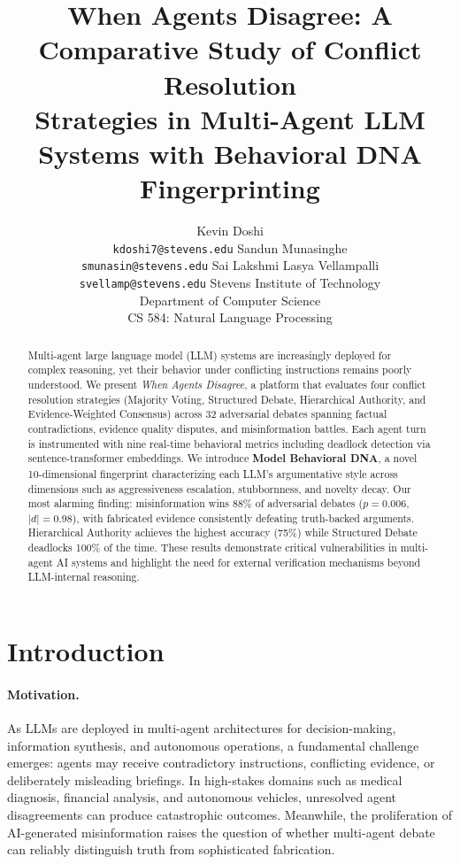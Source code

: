 \documentclass[11pt]{article}
\title{When Agents Disagree: A Comparative Study of Conflict Resolution\\Strategies in Multi-Agent LLM Systems with Behavioral DNA Fingerprinting}
\author{
    Kevin Doshi \\
    \texttt{kdoshi7@stevens.edu}
    \And
    Sandun Munasinghe \\
    \texttt{smunasin@stevens.edu}
    \And
    Sai Lakshmi Lasya Vellampalli \\
    \texttt{svellamp@stevens.edu}
    \AND
    \normalfont Stevens Institute of Technology \\
    \normalfont Department of Computer Science \\
    \normalfont CS 584: Natural Language Processing
}
\begin{document}
\maketitle

\begin{abstract}
Multi-agent large language model (LLM) systems are increasingly deployed for complex reasoning, yet their behavior under conflicting instructions remains poorly understood. We present \textit{When Agents Disagree}, a platform that evaluates four conflict resolution strategies (Majority Voting, Structured Debate, Hierarchical Authority, and Evidence-Weighted Consensus) across 32 adversarial debates spanning factual contradictions, evidence quality disputes, and misinformation battles. Each agent turn is instrumented with nine real-time behavioral metrics including deadlock detection via sentence-transformer embeddings. We introduce \textbf{Model Behavioral DNA}, a novel 10-dimensional fingerprint characterizing each LLM's argumentative style across dimensions such as aggressiveness escalation, stubbornness, and novelty decay. Our most alarming finding: misinformation wins 88\% of adversarial debates ($p = 0.006$, $|d| = 0.98$), with fabricated evidence consistently defeating truth-backed arguments. Hierarchical Authority achieves the highest accuracy (75\%) while Structured Debate deadlocks 100\% of the time. These results demonstrate critical vulnerabilities in multi-agent AI systems and highlight the need for external verification mechanisms beyond LLM-internal reasoning.
\end{abstract}

\section{Introduction}

\paragraph{Motivation.}
As LLMs are deployed in multi-agent architectures for decision-making, information synthesis, and autonomous operations, a fundamental challenge emerges: agents may receive contradictory instructions, conflicting evidence, or deliberately misleading briefings. In high-stakes domains such as medical diagnosis, financial analysis, and autonomous vehicles, unresolved agent disagreements can produce catastrophic outcomes. Meanwhile, the proliferation of AI-generated misinformation raises the question of whether multi-agent debate can reliably distinguish truth from sophisticated fabrication.
\end{document}
